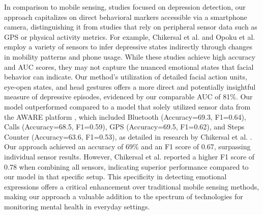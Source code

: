In comparison to mobile sensing, studies focused on depression detection, our approach capitalizes on direct behavioral markers accessible via a smartphone camera, distinguishing it from studies that rely on peripheral sensor data such as GPS or physical activity metrics. For example, Chikersal et al. \cite{chikersal2021detecting} and Opoku et al. \cite{opoku2022mood} employ a variety of sensors to infer depressive states indirectly through changes in mobility patterns and phone usage. While these studies achieve high accuracy and AUC scores, they may not capture the nuanced emotional states that facial behavior can indicate. Our method's utilization of detailed facial action units, eye-open states, and head gestures offers a more direct and potentially insightful measure of depressive episodes, evidenced by our comparable AUC of 81\%. Our model outperformed compared to a model that solely utilized sensor data from the AWARE platform \cite{ferreira2015aware}, which included Bluetooth (Accuracy=69.3, F1=0.64), Calls (Accuracy=68.5, F1=0.59), GPS (Accuracy=69.5, F1=0.62), and Steps Counter (Accuracy=63.6, F1=0.53), as detailed in research by Chikersal et al. \cite{chikersal2021detecting}. Our approach achieved an accuracy of 69\% and an F1 score of 0.67, surpassing individual sensor results. However, Chikersal et al. reported a higher F1 score of 0.78 when combining all sensors, indicating superior performance compared to our model in that specific setup. This specificity in detecting emotional expressions offers a critical enhancement over traditional mobile sensing methods, making our approach a valuable addition to the spectrum of technologies for monitoring mental health in everyday settings.

